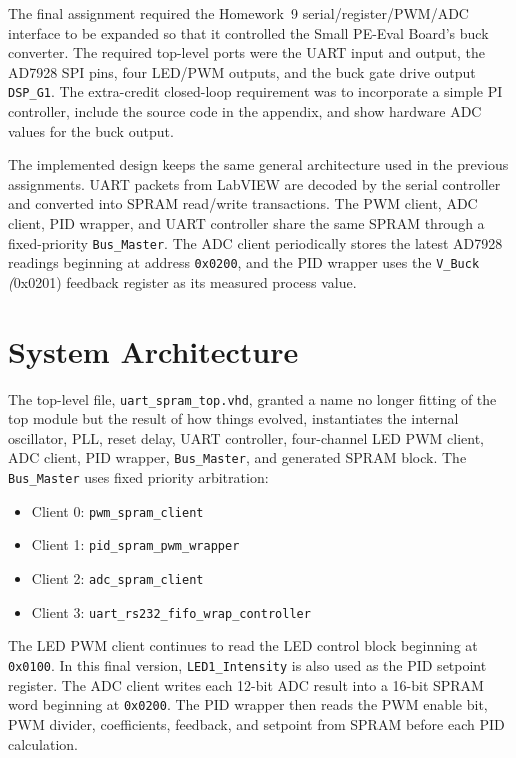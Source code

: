 \documentclass[12pt]{article}
\begin{document}
The final assignment required the Homework~9 serial/register/PWM/ADC interface to be expanded so that it controlled the Small PE-Eval Board's buck converter. The required top-level ports were the UART input and output, the AD7928 SPI pins, four LED/PWM outputs, and the buck gate drive output \texttt{DSP\_G1}. The extra-credit closed-loop requirement was to incorporate a simple PI controller, include the source code in the appendix, and show hardware ADC values for the buck output.

The implemented design keeps the same general architecture used in the previous assignments. UART packets from LabVIEW are decoded by the serial controller and converted into SPRAM read/write transactions. The PWM client, ADC client, PID wrapper, and UART controller share the same SPRAM through a fixed-priority \texttt{Bus\_Master}. The ADC client periodically stores the latest AD7928 readings beginning at address \texttt{0x0200}, and the PID wrapper uses the \texttt{V\_Buck} \textit(0x0201) feedback register as its measured process value.

\section*{System Architecture}

The top-level file, \texttt{uart\_spram\_top.vhd}, granted a name no longer fitting of the top module but the result of how things evolved, instantiates the internal oscillator, PLL, reset delay, UART controller, four-channel LED PWM client, ADC client, PID wrapper, \texttt{Bus\_Master}, and generated SPRAM block. The \texttt{Bus\_Master} uses fixed priority arbitration:

\begin{itemize}
  \item Client 0: \texttt{pwm\_spram\_client}
  \item Client 1: \texttt{pid\_spram\_pwm\_wrapper}
  \item Client 2: \texttt{adc\_spram\_client}
  \item Client 3: \texttt{uart\_rs232\_fifo\_wrap\_controller}
\end{itemize}

\noindent The LED PWM client continues to read the LED control block beginning at \texttt{0x0100}. In this final version, \texttt{LED1\_Intensity} is also used as the PID setpoint register. The ADC client writes each 12-bit ADC result into a 16-bit SPRAM word beginning at \texttt{0x0200}. The PID wrapper then reads the PWM enable bit, PWM divider, coefficients, feedback, and setpoint from SPRAM before each PID calculation.
\end{document}
